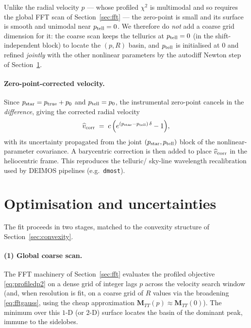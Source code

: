 \documentclass[11pt]{article}
\begin{document}
Unlike the radial velocity $p$ --- whose profiled $\chi^2$ is multimodal and so
requires the global FFT scan of Section~\ref{sec:fft} --- the zero-point is small
and its surface is smooth and unimodal near $p_{\rm tell}=0$. We therefore do
\emph{not} add a coarse grid dimension for it: the coarse scan keeps the tellurics at
$p_{\rm tell}=0$ (in the shift-independent block) to locate the $(p,R)$ basin, and
$p_{\rm tell}$ is initialised at $0$ and refined \emph{jointly} with the other
nonlinear parameters by the autodiff Newton step of Section~\ref{sec:opt}.

\paragraph{Zero-point-corrected velocity.}
Since $p_{\rm star}=p_{\rm true}+p_0$ and $p_{\rm tell}=p_0$, the instrumental
zero-point cancels in the \emph{difference}, giving the corrected radial velocity
\begin{equation}
  \widehat v_{\rm corr} \;=\; c\,\Big(e^{(p_{\rm star}-p_{\rm tell})\,\delta}-1\Big),
  \label{eq:vcorr}
\end{equation}
with its uncertainty propagated from the joint $(p_{\rm star},p_{\rm tell})$ block of
the nonlinear-parameter covariance. A barycentric correction is then added to place
$\widehat v_{\rm corr}$ in the heliocentric frame. This reproduces the telluric/
sky-line wavelength recalibration used by DEIMOS pipelines (e.g.\ \texttt{dmost}).

\section{Optimisation and uncertainties}
\label{sec:opt}
The fit proceeds in two stages, matched to the convexity structure of
Section~\ref{sec:convexity}.

\paragraph{(1) Global coarse scan.}
The FFT machinery of Section~\ref{sec:fft} evaluates the profiled objective
\eqref{eq:profiledp2} on a dense grid of integer lags $p$ across the velocity
search window (and, when resolution is fit, on a coarse grid of $R$ values via the
broadening \eqref{eq:fftgauss}, using the cheap approximation
$\mathbf{M}_{TT}(p)\approx\mathbf{M}_{TT}(0)$). The minimum over this $1$-D (or
$2$-D) surface locates the basin of the dominant peak, immune to the sidelobes.
\end{document}
